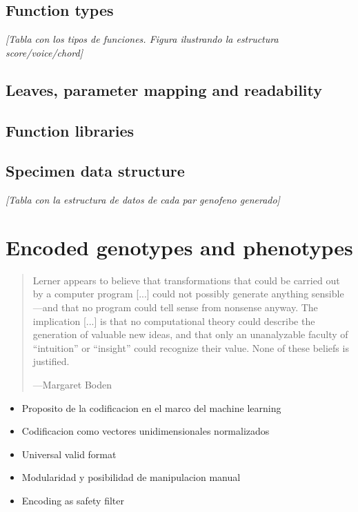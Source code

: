 \documentclass{article}
\begin{document}
\subsection{Function types}

{\color{gray} \textsl{[Tabla con los tipos de funciones. Figura ilustrando la estructura score/voice/chord]}}

\subsection{Leaves, parameter mapping and readability}

\subsection{Function libraries}

\subsection{Specimen data structure}


{\color{gray} \textsl{[Tabla con la estructura de datos de cada par geno\/feno generado]}}



\section{Encoded genotypes and phenotypes}

\begin{samepage}
\begin{quotation}
Lerner appears to believe that transformations that could be carried
out by a computer program [...] could not possibly generate anything sensible---and that no program could tell sense from nonsense anyway. The implication [...] is that no computational theory could describe the generation of valuable new ideas, and that only an unanalyzable faculty of ``intuition'' or ``insight'' could recognize their value. None of these beliefs is justified.

---Margaret Boden \cite{BodenWhatIsCr}
\end{quotation}
\end{samepage}


{\color{gray}


\begin{itemize}
\item Proposito de la codificacion en el marco del machine learning
\item Codificacion como vectores unidimensionales normalizados
\item Universal valid format
\item Modularidad y posibilidad de manipulacion manual
\item Encoding as safety filter

\end{itemize}

}
\end{document}
